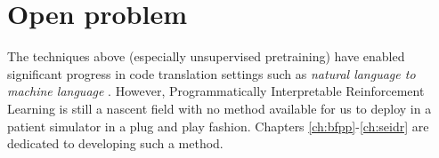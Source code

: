 \newpage
\section{Open problem}
\label{sec:goal}

The techniques above (especially unsupervised pretraining) have enabled significant progress in code translation settings such as \emph{natural language to machine language} \cite{chenEvaluatingLargeLanguage2021, conala, guoContentEnhancedBERTbased2020, hallerPECCProblemExtraction2024, hendrycksMeasuringCodingChallenge2021, honarvarTurbulenceSystematicallyAutomatically2025, huQualityFlowAgenticWorkflow2025, jimenezSWEbenchCanLanguage2024, leiPlanningDrivenProgrammingLarge2025, liEnablingProgrammingThinking2023, liExploringEffectivenessLlms2023, psb2, solimanMarianCGCodeGeneration2022, the-crypt-keeperThecryptkeeperCanaicode2025, zhuoBigCodeBenchBenchmarkingCode2024}.
However, Programmatically Interpretable Reinforcement Learning is still a nascent field with no method available for us to deploy in a patient simulator in a plug and play fashion.
Chapters \ref{ch:bfpp}-\ref{ch:seidr} are dedicated to developing such a method.